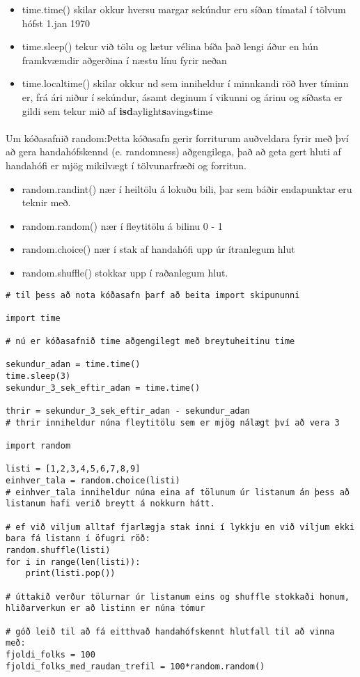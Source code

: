 \begin{itemize}
	\item time.time() skilar okkur hversu margar sekúndur eru síðan tímatal í tölvum hófst 1.jan 1970
	\item time.sleep() tekur við tölu og lætur vélina bíða það lengi áður en hún framkvæmdir aðgerðina í næstu línu fyrir neðan
	\item time.localtime() skilar okkur nd sem inniheldur í minnkandi röð hver tíminn er, frá ári niður í sekúndur, ásamt deginum í vikunni og árinu og síðasta er gildi sem tekur mið af \textbf{is}\textbf{d}aylight\textbf{s}avings\textbf{t}ime
\end{itemize}

\paragraph{}
Um kóðasafnið random:Þetta kóðasafn gerir forriturum auðveldara fyrir með því að gera handahófskennd (e. randomness) aðgengilega, það að geta gert hluti af handahófi er mjög mikilvægt í tölvunarfræði og forritun.

\begin{itemize}
	\item random.randint() nær í heiltölu á lokuðu bili, þar sem báðir endapunktar eru teknir með.
	\item random.random() nær í fleytitölu á bilinu 0 - 1
	\item random.choice() nær í stak af handahófi upp úr ítranlegum hlut
	\item random.shuffle() stokkar upp í raðanlegum hlut.
\end{itemize}

\begin{lstlisting}[caption=Notkun Kóðasafna, label=lst:kóðasöfn-kynnt]
# til þess að nota kóðasafn þarf að beita import skipununni

import time

# nú er kóðasafnið time aðgengilegt með breytuheitinu time

sekundur_adan = time.time()
time.sleep(3)
sekundur_3_sek_eftir_adan = time.time()

thrir = sekundur_3_sek_eftir_adan - sekundur_adan
# thrir inniheldur núna fleytitölu sem er mjög nálægt því að vera 3

import random

listi = [1,2,3,4,5,6,7,8,9]
einhver_tala = random.choice(listi)
# einhver_tala inniheldur núna eina af tölunum úr listanum án þess að listanum hafi verið breytt á nokkurn hátt.

# ef við viljum alltaf fjarlægja stak inni í lykkju en við viljum ekki bara fá listann í öfugri röð:
random.shuffle(listi)
for i in range(len(listi)):
	print(listi.pop())
	
# úttakið verður tölurnar úr listanum eins og shuffle stokkaði honum, hliðarverkun er að listinn er núna tómur

# góð leið til að fá eitthvað handahófskennt hlutfall til að vinna með:
fjoldi_folks = 100
fjoldi_folks_med_raudan_trefil = 100*random.random()


\end{lstlisting}

